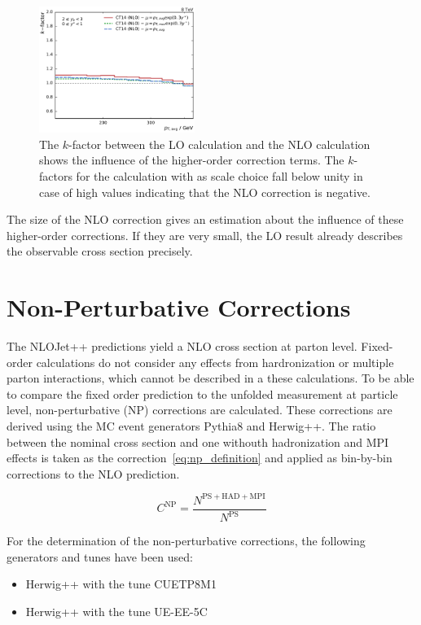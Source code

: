 \begin{figure}[htp]
    \includegraphics[width=0.45\textwidth]{figures/theory/kfactor_comp_yb2ys0.pdf}
    \caption{The $k$-factor between the LO calculation and the NLO calculation
    shows the influence of the higher-order correction terms. The $k$-factors
for the calculation with \ptavg as scale choice fall below unity in case of high
\ystar values indicating that the NLO correction is negative.}
    \label{fig:kfactor_comp}
\end{figure}

The size of the NLO correction gives an estimation about the influence of these
higher-order corrections. If they are very small, the LO result already
describes the observable cross section precisely.

\section{Non-Perturbative Corrections}

The NLOJet++ predictions yield a NLO cross section at parton level.  Fixed-order
calculations do not consider any effects from hardronization or multiple parton
interactions, which cannot be described in a these calculations. To be able to
compare the fixed order prediction to the unfolded measurement at particle
level, non-perturbative (NP) corrections are calculated. These corrections are
derived using the MC event generators Pythia8 and Herwig++. The ratio between
the nominal cross section and one withouth hadronization and MPI effects is
taken as the correction~\ref{eq:np_definition} and applied as bin-by-bin corrections to the NLO
prediction.

\begin{equation}
    C^{\mathrm{NP}} = \frac{N^{\mathrm{PS+HAD+MPI}}}{N^{\mathrm{PS}}}
    \label{eq:np_definition}
\end{equation}

For the determination of the non-perturbative corrections, the following
generators and tunes have been used:

\begin{itemize}
    \item Herwig++ with the tune CUETP8M1
    \item Herwig++ with the tune UE-EE-5C
\end{itemize}

